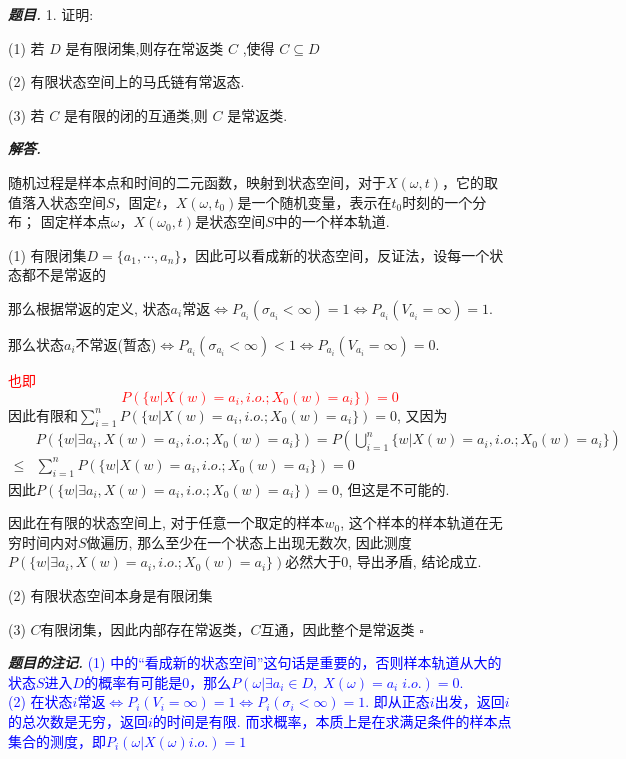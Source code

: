 \documentclass[10pt, a4paper, oneside]{ctexart}
\newenvironment{problem}{\begin{framed}\par\noindent\textbf{\textit{题目. }}}{\end{framed}\par}
\newenvironment{solution}{%
  \par\noindent\textbf{\textit{解答. }}\ignorespaces
}{%
  \hfill\ensuremath{\square}\par %
}
\newenvironment{note}{\par\noindent\textbf{\textit{题目的注记. }}\ignorespaces}{\par}
\begin{document}
\begin{problem}
1. 证明:

(1) 若 $D$ 是有限闭集,则存在常返类 $C$ ,使得 $C \subseteq D$

(2) 有限状态空间上的马氏链有常返态.

(3) 若 $C$ 是有限的闭的互通类,则 $C$ 是常返类.   
\end{problem}
\begin{solution}
随机过程是样本点和时间的二元函数，映射到状态空间，对于$X(\omega,t)$，它的取值落入状态空间$S$，固定$t$，$X(\omega,t_0)$是一个随机变量，表示在$t_0$时刻的一个分布； 固定样本点$\omega$，$X(\omega_0,t)$是状态空间$S$中的一个样本轨道.

(1) 有限闭集$D=\{a_1,\cdots,a_n\}$，因此可以看成新的状态空间，反证法，设每一个状态都不是常返的

那么根据常返的定义, 状态$a_i$常返$\iff P_{a_i}(\sigma_{a_i}<\infty)=1 \iff P_{a_i}(V_{a_i}=\infty)=1$.

那么状态$a_i$不常返(暂态)$\iff P_{a_i}(\sigma_{a_i}<\infty)<1\iff P_{a_i}(V_{a_i}=\infty)=0$.

\textcolor{red}{也即
$$P(\{w|X(w)=a_i, i.o. ; X_0(w)=a_i \})=0$$
}
因此有限和$\sum_{i=1}^{n}P(\{w|X(w)=a_i, i.o. ; X_0(w)=a_i \})=0$, 又因为 
\begin{align*}
    &P(\{w|\exists a_i, X(w)=a_i, i.o. ; X_0(w)=a_i \})=P(\bigcup_{i=1}^{n}\{w|X(w)=a_i, i.o. ; X_0(w)=a_i \})\\\leq& \sum_{i=1}^nP(\{w|X(w)=a_i, i.o. ; X_0(w)=a_i \})=0
\end{align*}
因此$P(\{w|\exists a_i, X(w)=a_i, i.o. ; X_0(w)=a_i \})=0$, 但这是不可能的.

因此在有限的状态空间上, 对于任意一个取定的样本$w_0$, 这个样本的样本轨道在无穷时间内对$S$做遍历, 那么至少在一个状态上出现无数次, 因此测度$P(\{w|\exists a_i, X(w)=a_i, i.o. ; X_0(w)=a_i \})$必然大于$0$, 导出矛盾, 结论成立.

(2) 有限状态空间本身是有限闭集

(3) $C$有限闭集，因此内部存在常返类，$C$互通，因此整个是常返类
\end{solution}
\begin{note}
\textcolor{blue}{(1) 中的“看成新的状态空间”这句话是重要的，否则样本轨道从大的状态$S$进入$D$的概率有可能是$0$，那么$P(\omega| \exists a_i \in D, \; X(\omega)=a_i\; i.o.)=0$.\\(2) 在状态$i$常返$\iff P_i(V_i=\infty)=1\iff P_i(\sigma_i<\infty)=1$. 即从正态$i$出发，返回$i$的总次数是无穷，返回$i$的时间是有限. 而求概率，本质上是在求满足条件的样本点集合的测度，即$P_i(\omega|X(\omega) i.o.)=1$}
\end{note}
\end{document}
